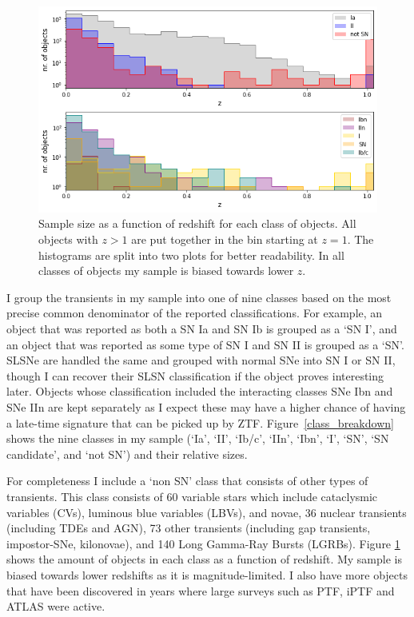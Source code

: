 \documentclass[a4paper,oneside,12pt, class=Latex/Classes/PhDthesisPSnPDF, crop=false]{standalone}
\begin{document}
\begin{figure}
    \centering
    \includegraphics[width=\textwidth]{../Images/chapter_4/sample_hists_vert.png}
    \caption{Sample size as a function of redshift for each class of objects. All objects with $z>1$ are put together in the bin starting at $z=1$. The histograms are split into two plots for better readability. In all classes of objects my sample is biased towards lower $z$.}
    \label{class_hists}
\end{figure}

I group the transients in my sample into one of nine classes based on the most precise common denominator of the reported classifications. For example, an object that was reported as both a SN Ia and SN Ib is grouped as a `SN I', and an object that was reported as some type of SN I and SN II is grouped as a `SN'. SLSNe are handled the same and grouped with normal SNe into SN I or SN II, though I can recover their SLSN classification if the object proves interesting later. Objects whose classification included the interacting classes SNe Ibn and SNe IIn are kept separately as I expect these may have a higher chance of having a late-time signature that can be picked up by ZTF. Figure~\ref{class_breakdown} shows the nine classes in my sample (`Ia', `II', `Ib/c', `IIn', `Ibn', `I', `SN', `SN candidate', and `not SN') and their relative sizes.

For completeness I include a `non SN' class that consists of other types of transients. This class consists of 60 variable stars which include cataclysmic variables (CVs), luminous blue variables (LBVs), and novae, 36 nuclear transients (including TDEs and AGN), 73 other transients (including gap transients, impostor-SNe, kilonovae), and 140 Long Gamma-Ray Bursts (LGRBs).
Figure \ref{class_hists} shows the amount of objects in each class as a function of redshift. My sample is biased towards lower redshifts as it is magnitude-limited. I also have more objects that have been discovered in years where large surveys such as PTF, iPTF and ATLAS were active.
\end{document}
